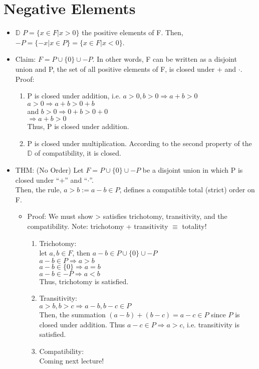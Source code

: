 \documentclass[11pt]{article}
\begin{document}
\section{Negative Elements}
\label{sec:org733b782}
\begin{itemize}
\item \(\mathbb{D}\) \(P=\{x\in F | x>0\}\) the positive elements of F. Then, \(-P = \{-x | x \in P\} = \{x \in F | x < 0\}\).
\item Claim: \(F = P \cup \{0\} \cup -P\). In other words, F can be written as a disjoint union and P, the set of all positive elements of F, is closed under \(+\) and \(\cdot\).\\[0pt]
Proof:
\begin{enumerate}
\item P is closed under addition, i.e. \(a >0, b>0 \Rightarrow a+b > 0\)\\[0pt]
\(a > 0 \Rightarrow a+b > 0 + b\) \\[0pt]
and \(b > 0 \Rightarrow 0 + b > 0 + 0\)\\[0pt]
\(\Rightarrow a+b > 0\)\\[0pt]
Thus, P is closed under addition.
\item P is closed under multiplication. According to the second property of the \(\mathbb{D}\) of compatibility, it is closed.
\end{enumerate}
\item THM: (No Order) Let \(F = P \cup \{0\} \cup -P\) be a disjoint union in which P is closed under ``\(+\)'' and ``\(\cdot\)''. \\[0pt]
Then, the rule, \(a > b := a-b\in P\), defines a compatible total (strict) order on F.
\begin{itemize}
\item Proof: We must show > satisfies trichotomy, transitivity, and the compatibility. Note: trichotomy + transitivity \(\equiv\) totality!
\begin{enumerate}
\item Trichotomy:\\[0pt]
let \(a, b \in F\), then \(a -b \in P \cup\{0\}\cup -P\)\\[0pt]
\(a-b\in P \Rightarrow a >b\)\\[0pt]
\(a-b \in \{0\} \Rightarrow a = b\)\\[0pt]
\(a- b \in -P \Rightarrow a < b\)\\[0pt]
Thus, trichotomy is satisfied.
\item Transitivity:\\[0pt]
\(a > b, b > c \Rightarrow a-b, b-c \in P\)\\[0pt]
Then, the summation \((a-b) + (b-c) = a-c \in P\) since \(P\) is closed under addition.
Thus \(a-c\in P \Rightarrow a > c\), i.e. transitivity is satisfied.
\item Compatibility:\\[0pt]
Coming next lecture!
\end{enumerate}
\end{itemize}
\end{itemize}
\end{document}
